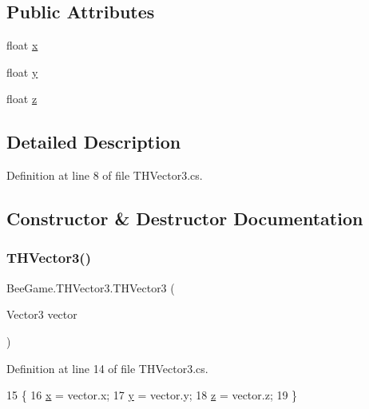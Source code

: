 \subsection*{Public Attributes}
\begin{DoxyCompactItemize}
\item 
float \hyperlink{struct_bee_game_1_1_t_h_vector3_a3a414a33eefb779cc52428463f428b6d}{x}
\item 
float \hyperlink{struct_bee_game_1_1_t_h_vector3_a58f88e615565042dbab4e4ba6ab1b3a6}{y}
\item 
float \hyperlink{struct_bee_game_1_1_t_h_vector3_a56c61f039a2cdabc8a371d2faa9838fa}{z}
\end{DoxyCompactItemize}


\subsection{Detailed Description}


Definition at line 8 of file T\+H\+Vector3.\+cs.



\subsection{Constructor \& Destructor Documentation}
\mbox{\label{struct_bee_game_1_1_t_h_vector3_ad1b3467b019ea95fc114536aab566fb4}} 
\subsubsection{\texorpdfstring{T\+H\+Vector3()}{THVector3()}\hspace{0.1cm}{\footnotesize\ttfamily [1/2]}}
{\footnotesize\ttfamily Bee\+Game.\+T\+H\+Vector3.\+T\+H\+Vector3 (\begin{DoxyParamCaption}\item[{Vector3}]{vector }\end{DoxyParamCaption})}



Definition at line 14 of file T\+H\+Vector3.\+cs.


\begin{DoxyCode}
15         \{
16             \hyperlink{struct_bee_game_1_1_t_h_vector3_a3a414a33eefb779cc52428463f428b6d}{x} = vector.x;
17             \hyperlink{struct_bee_game_1_1_t_h_vector3_a58f88e615565042dbab4e4ba6ab1b3a6}{y} = vector.y;
18             \hyperlink{struct_bee_game_1_1_t_h_vector3_a56c61f039a2cdabc8a371d2faa9838fa}{z} = vector.z;
19         \}
\end{DoxyCode}
\mbox{\label{struct_bee_game_1_1_t_h_vector3_aa2dd19cb61f71544d9126e647eb76b4b}} 
